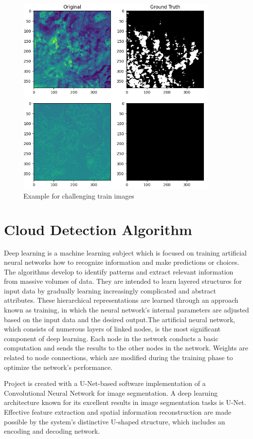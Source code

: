 \begin{figure}[htp]
    \centering
    \includegraphics[width=10cm]{projectChapters/images/hard.png}
    \caption{Example for challenging train images}
    \label{hard}
\end{figure}
\newpage
\section{Cloud Detection Algorithm}

Deep learning is a machine learning subject which is focused on training artificial neural networks how to recognize information and make predictions or choices. The algorithms develop to identify patterns and extract relevant information from massive volumes of data. They are intended to learn layered structures for input data by gradually learning increasingly complicated and abstract attributes. These hierarchical representations are learned through an approach known as training, in which the neural network's internal parameters are adjusted based on the input data and the desired output.The artificial neural network, which consists of numerous layers of linked nodes, is the most significant component of deep learning. Each node in the network conducts a basic computation and sends the results to the other nodes in the network. Weights are related to node connections, which are modified during the training phase to optimize the network's performance.

Project is created with a U-Net-based software implementation of a Convolutional Neural Network for image segmentation. A deep learning architecture known for its excellent results in image segmentation tasks is U-Net. Effective feature extraction and spatial information reconstruction are made possible by the system's distinctive U-shaped structure, which includes an encoding and decoding network.

